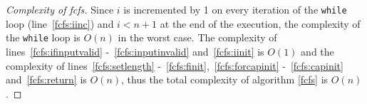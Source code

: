\begin{proof}[Complexity of fcfs]
  Since $i$ is incremented by 1 on every iteration of the \texttt{while} loop (line~\ref{fcfs:iinc}) and $i < n+1$ at the
  end of the execution, the complexity of the \texttt{while} loop is $O\left(n\right)$ in the worst case. The complexity of
  lines~\ref{fcfs:ifinputvalid} -~\ref{fcfs:inputinvalid} and~\ref{fcfs:iinit} is $O\left(1\right)$ and the complexity of
  lines~\ref{fcfs:setlength} -~\ref{fcfs:finit},~\ref{fcfs:forcapinit} -~\ref{fcfs:capinit} and~\ref{fcfs:return} is
  $O\left(n\right)$, thus the total complexity of algorithm \ref{fcfs} is $O\left(n\right)$.
\end{proof}
